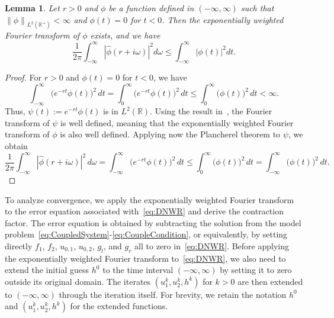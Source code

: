 \documentclass[reqno]{amsart}
\newtheorem{lemma}{Lemma}
\newcommand{\norm}[1]{\left\lVert#1\right\rVert}
\begin{document}
\begin{lemma}\label{prepCont2norm}
Let $r > 0$ and $\phi$ be a function defined in $(-\infty,\infty)$ such that $\norm{\phi}_{L^2(\mathbb{R^+})} < \infty$ and $\phi(t) = 0$ for $t < 0$. Then the exponentially weighted Fourier transform of $\phi$ exists, and we have
\[\frac{1}{2 \pi} \int_{-\infty}^{\infty} |\hat{\phi}(r+i\omega)|^2 d\omega \leq \int_{-\infty}^{\infty} |\phi(t)|^2 dt.\]
\end{lemma}

\begin{proof}
For $r > 0$ and $\phi(t) = 0$ for $t < 0$, we have
\[\int_{-\infty}^{\infty} \big(e^{-rt} \phi(t)\big)^2 \, dt =  \int_{0}^{\infty} \big(e^{-rt}\phi(t)\big)^2 \, dt \leq \int_{0}^{\infty} \big(\phi(t)\big)^2 \, dt < \infty.\]
Thus, $\psi(t) := e^{-r t} \phi(t)$ is in $L^2(\mathbb{R})$. Using the result in~\cite{grafakos2014a}, the Fourier transform of $\psi$ is well defined, meaning that the exponentially weighted Fourier transform of $\phi$ is also well defined. 
Applying now the Plancherel theorem to $\psi$, we obtain 
\[\frac{1}{2 \pi} \int_{-\infty}^{\infty} |\hat{\phi}(r+i\omega)|^2 \, d\omega = \int_{-\infty}^{\infty} \big(e^{-rt} \phi(t)\big)^2 \, dt \leq \int_{0}^{\infty} \big(\phi(t)\big)^2 \, dt = \int_{-\infty}^{\infty} \big(\phi(t)\big)^2 \, dt.\]
\end{proof}


To analyze convergence, we apply the exponentially weighted Fourier transform to the error equation associated with~\eqref{eq:DNWR} and derive the contraction factor. The error equation is obtained by subtracting the solution from the model problem~\eqref{eq:CoupledSystem}-\eqref{eq:CoupleCondition}, or equivalently, by setting directly $f_1$, $f_2$, $u_{0,1}$, $u_{0,2}$, $g_l$, and $g_r$ all to zero in~\eqref{eq:DNWR}. Before applying the exponentially weighted Fourier transform to~\eqref{eq:DNWR}, we also need to extend the initial guess $h^0$ to the time interval $(-\infty, \infty)$ by setting it to zero outside its original domain. The iterates $(u_1^k, u_2^k, h^k)$ for $k>0$ are then extended to $(-\infty,\infty)$ through the iteration itself. For brevity, we retain the notation $h^0$ and $(u_1^k, u_2^k, h^k)$ for the extended functions. 
\end{document}
